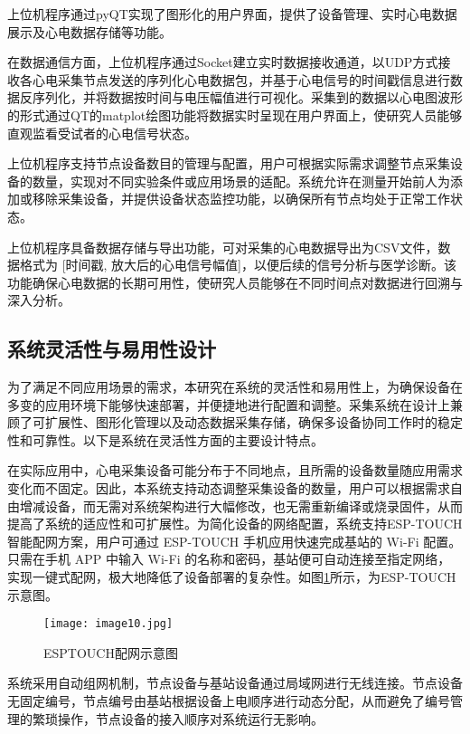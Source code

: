 上位机程序通过pyQT实现了图形化的用户界面，提供了设备管理、实时心电数据展示及心电数据存储等功能。

在数据通信方面，上位机程序通过Socket建立实时数据接收通道，以UDP方式接收各心电采集节点发送的序列化心电数据包，并基于心电信号的时间戳信息进行数据反序列化，并将数据按时间与电压幅值进行可视化。采集到的数据以心电图波形的形式通过QT的matplot绘图功能将数据实时呈现在用户界面上，使研究人员能够直观监看受试者的心电信号状态。

上位机程序支持节点设备数目的管理与配置，用户可根据实际需求调整节点采集设备的数量，实现对不同实验条件或应用场景的适配。系统允许在测量开始前人为添加或移除采集设备，并提供设备状态监控功能，以确保所有节点均处于正常工作状态。 

上位机程序具备数据存储与导出功能，可对采集的心电数据导出为CSV文件，数据格式为 [时间戳, 放大后的心电信号幅值]，以便后续的信号分析与医学诊断。该功能确保心电数据的长期可用性，使研究人员能够在不同时间点对数据进行回溯与深入分析。

\subsection{系统灵活性与易用性设计}

为了满足不同应用场景的需求，本研究在系统的灵活性和易用性上，为确保设备在多变的应用环境下能够快速部署，并便捷地进行配置和调整。采集系统在设计上兼顾了可扩展性、图形化管理以及动态数据采集存储，确保多设备协同工作时的稳定性和可靠性。以下是系统在灵活性方面的主要设计特点。

在实际应用中，心电采集设备可能分布于不同地点，且所需的设备数量随应用需求变化而不固定。因此，本系统支持动态调整采集设备的数量，用户可以根据需求自由增减设备，而无需对系统架构进行大幅修改，也无需重新编译或烧录固件，从而提高了系统的适应性和可扩展性。为简化设备的网络配置，系统支持ESP-TOUCH智能配网方案，用户可通过 ESP-TOUCH 手机应用快速完成基站的 Wi-Fi 配置。只需在手机 APP 中输入 Wi-Fi 的名称和密码，基站便可自动连接至指定网络，实现一键式配网，极大地降低了设备部署的复杂性。如图\ref{F.ECG_image10}所示，为ESP-TOUCH示意图。

\begin{figure}[H]
    \centering
    \texttt{[image: image10.jpg]}
    \caption{ESPTOUCH配网示意图}
    \label{F.ECG_image10}
\end{figure}

系统采用自动组网机制，节点设备与基站设备通过局域网进行无线连接。节点设备无固定编号，节点编号由基站根据设备上电顺序进行动态分配，从而避免了编号管理的繁琐操作，节点设备的接入顺序对系统运行无影响。

